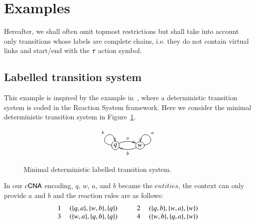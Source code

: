 \section{Examples}
\label{ex:examples}

Hereafter, we shall often omit topmost restrictions but shall take into account only transitions whose labels are complete chains, i.e. they do not contain 
virtual links and start/end with the $\tau$ action symbol.



\subsection{Labelled transition system}
This example is inspired by the example in~\cite{BEMR11}, where
a deterministic transition system is coded in the Reaction System
framework.
Here we consider the minimal deterministic transition system in Figure~\ref{fig:lts}.
\begin{figure}
\[
\xymatrix{
*+[o][F-]{q} \ar@/ ^/[r]^a \ar@(l,u)[]^b &
*+[o][F-]{w} \ar@/^/[l]^b \ar@(r,u)[]_a
}
\]
\caption{Minimal deterministic labelled transition system.}
\label{fig:lts}
\end{figure}
\noindent
In our $c\textsf{CNA}$ encoding, $q$, $w$, $a$, and $b$ became the $entities$, the context can only provide $a$ and $b$ and the reaction rules are as follows:\\
\[
\begin{array}{cl@{\hspace{1cm}} cl}
1 \ &(\{q,a\},\{w,b\},\{q\}) & 2\ &(\{q,b\},\{w,a\},\{w\})\\
3 \  &(\{w,a\},\{q,b\},\{q\}) & 4\ &(\{w,b\},\{q,a\},\{w\})\\ 
\end{array}
\]
